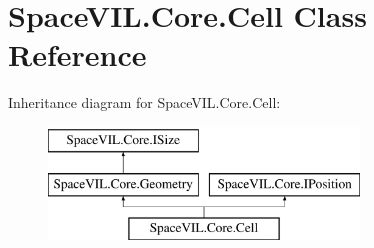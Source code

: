 \hypertarget{class_space_v_i_l_1_1_core_1_1_cell}{}\section{Space\+V\+I\+L.\+Core.\+Cell Class Reference}
\label{class_space_v_i_l_1_1_core_1_1_cell}
Inheritance diagram for Space\+V\+I\+L.\+Core.\+Cell\+:\begin{figure}[H]
\begin{center}
\leavevmode
\includegraphics[height=3.000000cm]{class_space_v_i_l_1_1_core_1_1_cell}
\end{center}
\end{figure}
